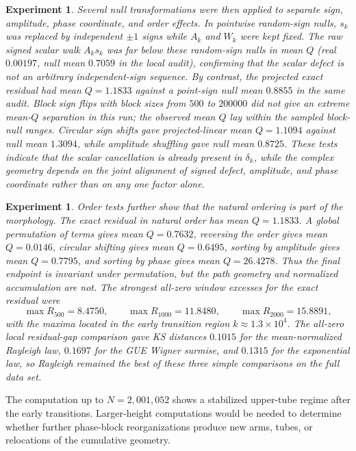 \documentclass[12pt]{article}
\numberwithin{equation}{section}
\newtheorem{experiment}[theorem]{Experiment}
\begin{document}
\begin{experiment}
\label{exp:all_zero_null_ablation}
Several null transformations were then applied to separate sign, amplitude, phase coordinate, and order effects.  In pointwise random-sign nulls, \(s_k\) was replaced by independent \(\pm1\) signs while \(A_k\) and \(W_k\) were kept fixed.  The raw signed scalar walk \(A_ks_k\) was far below these random-sign nulls in mean \(Q\) (real \(0.00197\), null mean \(0.7059\) in the local audit), confirming that the scalar defect is not an arbitrary independent-sign sequence.  By contrast, the projected exact residual had mean \(Q=1.1833\) against a point-sign null mean \(0.8855\) in the same audit.  Block sign flips with block sizes from \(500\) to \(200000\) did not give an extreme mean-\(Q\) separation in this run; the observed mean \(Q\) lay within the sampled block-null ranges.  Circular sign shifts gave projected-linear mean \(Q=1.1094\) against null mean \(1.3094\), while amplitude shuffling gave null mean \(0.8725\).  These tests indicate that the scalar cancellation is already present in \(\delta_k\), while the complex geometry depends on the joint alignment of signed defect, amplitude, and phase coordinate rather than on any one factor alone.
\end{experiment}

\begin{experiment}
\label{exp:all_zero_order_and_window_tests}
Order tests further show that the natural ordering is part of the morphology.  The exact residual in natural order has mean \(Q=1.1833\).  A global permutation of terms gives mean \(Q=0.7632\), reversing the order gives mean \(Q=0.0146\), circular shifting gives mean \(Q=0.6495\), sorting by amplitude gives mean \(Q=0.7795\), and sorting by phase gives mean \(Q=26.4278\).  Thus the final endpoint is invariant under permutation, but the path geometry and normalized accumulation are not.  The strongest all-zero window excesses for the exact residual were
\[
\max R_{500}=8.4750,\qquad
\max R_{1000}=11.8480,\qquad
\max R_{2000}=15.8891,
\]
with the maxima located in the early transition region \(k\approx 1.3\times10^4\).  The all-zero local residual-gap comparison gave KS distances \(0.1015\) for the mean-normalized Rayleigh law, \(0.1697\) for the GUE Wigner surmise, and \(0.1315\) for the exponential law, so Rayleigh remained the best of these three simple comparisons on the full data set.
\end{experiment}

\noindent The computation up to \(N=2,001,052\) shows a stabilized upper-tube regime after the early transitions.  Larger-height computations would be needed to determine whether further phase-block reorganizations produce new arms, tubes, or relocations of the cumulative geometry.
\end{document}
